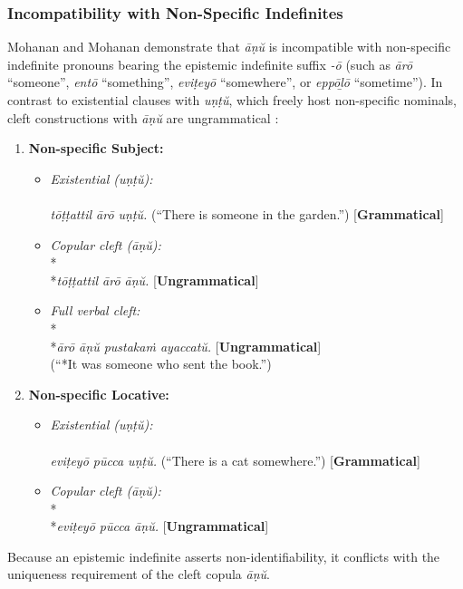 \subsubsection{Incompatibility with Non-Specific Indefinites}
Mohanan and Mohanan \citep{mohanan1999two} demonstrate that \textit{āṇŭ} is incompatible with non-specific indefinite pronouns bearing the epistemic indefinite suffix \textit{-ō} (such as  \textit{ārō} ``someone'',  \textit{entō} ``something'',  \textit{eviṭeyō} ``somewhere'', or  \textit{eppōḻō} ``sometime''). In contrast to existential clauses with \textit{uṇṭŭ}, which freely host non-specific nominals, cleft constructions with \textit{āṇŭ} are ungrammatical \citep[pp.~4--5, 12--13]{mohanan1999two}:
\begin{enumerate}[label=\textbf{\arabic*.}]
    \item \textbf{Non-specific Subject:}
    \begin{itemize}
        \item \textit{Existential (\textit{uṇṭŭ}):}\\
        \\
        \textit{tōṭṭattil ārō uṇṭŭ.} (``There is someone in the garden.'') [\textbf{Grammatical}]

        \item \textit{Copular cleft (\textit{āṇŭ}):}\\
        *\\
        *\textit{tōṭṭattil ārō āṇŭ.} [\textbf{Ungrammatical}]

        \item \textit{Full verbal cleft:}\\
        *\\
        *\textit{ārō āṇŭ pustakaṁ ayaccatŭ.} [\textbf{Ungrammatical}]\\
        (``*It was someone who sent the book.'')
    \end{itemize}

    \item \textbf{Non-specific Locative:}
    \begin{itemize}
        \item \textit{Existential (\textit{uṇṭŭ}):}\\
        \\
        \textit{eviṭeyō pūcca uṇṭŭ.} (``There is a cat somewhere.'') [\textbf{Grammatical}]

        \item \textit{Copular cleft (\textit{āṇŭ}):}\\
        *\\
        *\textit{eviṭeyō pūcca āṇŭ.} [\textbf{Ungrammatical}]
    \end{itemize}
\end{enumerate}
Because an epistemic indefinite asserts non-identifiability, it conflicts with the uniqueness requirement of the cleft copula \textit{āṇŭ}.
